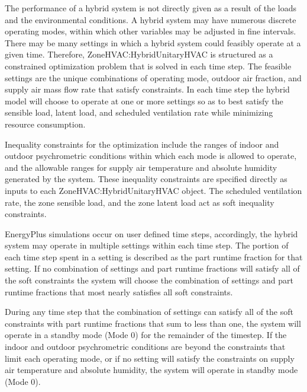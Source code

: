 The performance of a hybrid system is not directly given as a result of the loads and the environmental conditions. A hybrid system may have numerous discrete operating modes, within which other variables may be adjusted in fine intervals. There may be many settings in which a hybrid system could feasibly operate at a given time. Therefore, ZoneHVAC:HybridUnitaryHVAC is structured as a constrained optimization problem that is solved in each time step. The feasible settings are the unique combinations of operating mode, outdoor air fraction, and supply air mass flow rate that satisfy constraints. In each time step the hybrid model will choose to operate at one or more settings so as to best satisfy the sensible load, latent load, and scheduled ventilation rate while minimizing resource consumption. 

Inequality constraints for the optimization include the ranges of indoor and outdoor psychrometric conditions within which each mode is allowed to operate, and the allowable ranges for supply air temperature and absolute humidity generated by the system. These inequality constraints are specified directly as inputs to each ZoneHVAC:HybridUnitaryHVAC object. The scheduled ventilation rate, the zone sensible load, and the zone latent load act as soft inequality constraints. 

EnergyPlus simulations occur on user defined time steps, accordingly, the hybrid system may operate in multiple settings within each time step. The portion of each time step spent in a setting is described as the part runtime fraction for that setting. If no combination of settings and part runtime fractions will satisfy all of  the soft constraints the system will choose the combination of settings and part runtime fractions that most nearly satisfies all soft constraints. 

During any time step that the combination of settings can satisfy all of the soft constraints with part runtime fractions that sum to less than one, the system will operate in a standby mode (Mode 0) for the remainder of the timestep. If the indoor and outdoor psychrometric conditions are beyond the constraints that limit each operating mode, or if no setting will satisfy the constraints on supply air temperature and absolute humidity, the system will operate in standby mode (Mode 0).

